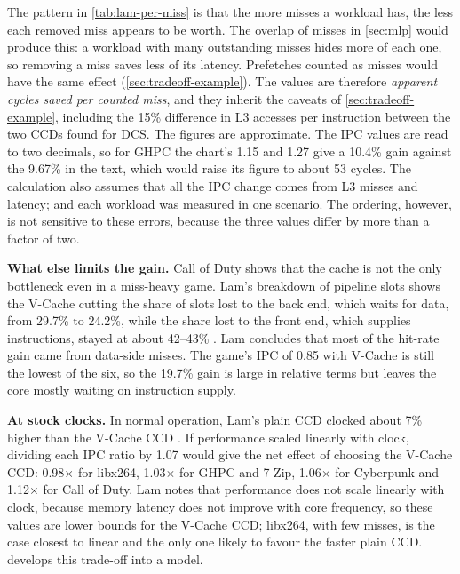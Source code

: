 The pattern in \cref{tab:lam-per-miss} is that the more misses a workload has, the less each removed miss appears to be worth. The overlap of misses in \cref{sec:mlp} would produce this: a workload with many outstanding misses hides more of each one, so removing a miss saves less of its latency. Prefetches counted as misses would have the same effect (\cref{sec:tradeoff-example}). The values are therefore \emph{apparent cycles saved per counted miss}, and they inherit the caveats of \cref{sec:tradeoff-example}, including the 15\% difference in L3 accesses per instruction between the two CCDs found for DCS. The figures are approximate. The IPC values are read to two decimals, so for GHPC the chart's 1.15 and 1.27 give a 10.4\% gain against the 9.67\% in the text, which would raise its figure to about 53 cycles. The calculation also assumes that all the IPC change comes from L3 misses and latency; and each workload was measured in one scenario. The ordering, however, is not sensitive to these errors, because the three values differ by more than a factor of two.

\textbf{What else limits the gain.} Call of Duty shows that the cache is not the only bottleneck even in a miss-heavy game. Lam's breakdown of pipeline slots shows the V-Cache cutting the share of slots lost to the back end, which waits for data, from 29.7\% to 24.2\%, while the share lost to the front end, which supplies instructions, stayed at about 42--43\% \cite{lamAMDs7950X3DZen2023}. Lam concludes that most of the hit-rate gain came from data-side misses. The game's IPC of 0.85 with V-Cache is still the lowest of the six, so the 19.7\% gain is large in relative terms but leaves the core mostly waiting on instruction supply.

\textbf{At stock clocks.} In normal operation, Lam's plain CCD clocked about 7\% higher than the V-Cache CCD \cite{lamAMDs7950X3DZen2023}. If performance scaled linearly with clock, dividing each IPC ratio by 1.07 would give the net effect of choosing the V-Cache CCD: 0.98$\times$ for libx264, 1.03$\times$ for GHPC and 7-Zip, 1.06$\times$ for Cyberpunk and 1.12$\times$ for Call of Duty. Lam notes that performance does not scale linearly with clock, because memory latency does not improve with core frequency, so these values are lower bounds for the V-Cache CCD; libx264, with few misses, is the case closest to linear and the only one likely to favour the faster plain CCD.  develops this trade-off into a model.

